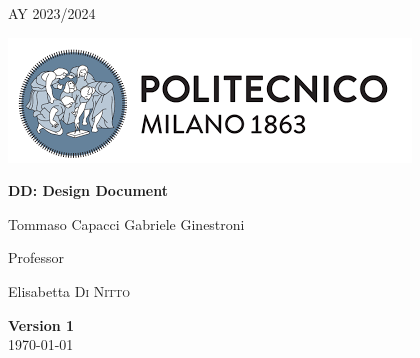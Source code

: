 \documentclass[table, 12pt]{article}
\begin{document}
\begin{titlepage}
    \centering
    {\scshape\large AY 2023/2024 \par}
    \vfill
    \includegraphics[scale=0.7]{Images/PolimiLogo.png}\par\vspace{1cm}
    \vspace{1cm}
    {\huge\bfseries DD\@: Design Document \par}
    \vspace{2cm}
    {\Large {Tommaso Capacci \quad Gabriele Ginestroni}\par}
    \vfill
    {\large Professor\par
        Elisabetta \textsc{Di Nitto}}
    \vfill
    {\large \textbf{Version 1}\\ \today \par}
\end{titlepage}
\thispagestyle{plain}
\mbox{}
\newpage
{}
\tableofcontents
\newpage
{}
\end{document}
